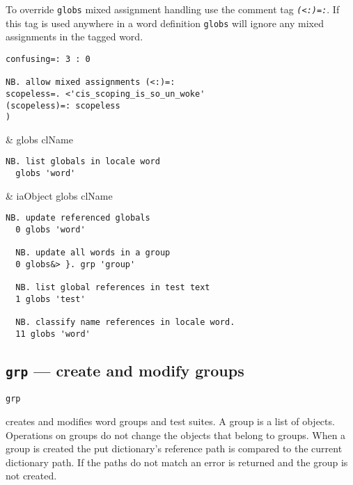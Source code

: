 \noindent To override \texttt{globs} mixed assignment handling use the comment tag
 \textcolor{CodeComment}{\texttt{\textsl{(<:)=:}}}.
If this tag is used anywhere in a word definition \texttt{globs} will ignore any 
mixed assignments in the tagged word.

\begin{lstlisting}[frame=single,framerule=0pt]
confusing=: 3 : 0

NB. allow mixed assignments (<:)=:
scopeless=. <'cis_scoping_is_so_un_woke'
(scopeless)=: scopeless 
)
\end{lstlisting}



\begin{wordhead}
\monad & globs clName \\
\end{wordhead}
\begin{lstlisting}[frame=single,framerule=0pt] 
  NB. list globals in locale word 
  globs 'word' 
\end{lstlisting}

\begin{wordhead}
\dyad & iaObject globs clName \\
\end{wordhead}
\begin{lstlisting}[frame=single,framerule=0pt] 
  NB. update referenced globals
  0 globs 'word' 

  NB. update all words in a group
  0 globs&> }. grp 'group' 

  NB. list global references in test text
  1 globs 'test'           

  NB. classify name references in locale word. 
  11 globs 'word'  
\end{lstlisting}


\subsection{\texttt{grp} --- create and modify groups}\label{ss:grp}

\hypertarget{il:grp}{\texttt{grp}} creates and modifies word groups
 and test suites. A group is a list of objects. Operations on groups do not change 
 the objects that belong to groups. When a group is created the
 put dictionary's reference path is compared to the current dictionary path. 
 If the paths do not match an error is returned and the group is not created. 

